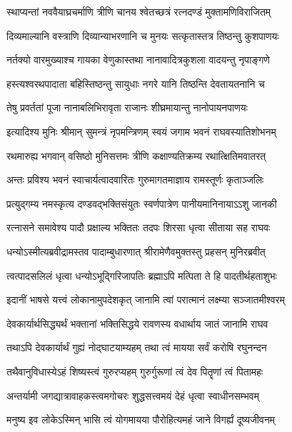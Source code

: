 \twolineshloka
{स्थाप्यन्तां नववैयाघ्रचर्माणि त्रीणि चानय}
{श्वेतच्छत्रं रत्नदण्डं मुक्तामणिविराजितम्} %

\twolineshloka
{दिव्यमाल्यानि वस्त्राणि दिव्यान्याभरणानि च}
{मुनयः सत्कृतास्तत्र तिष्ठन्तु कुशपाणयः} %

\twolineshloka
{नर्तक्यो वारमुख्याश्च गायका वेणुकास्तथा}
{नानावादित्रकुशला वादयन्तु नृपाङ्गणे} %

\twolineshloka
{हस्त्यश्वरथपादाता बहिस्तिष्ठन्तु सायुधाः}
{नगरे यानि तिष्ठन्ति देवतायतनानि च} %

\twolineshloka
{तेषु प्रवर्ततां पूजा नानाबलिभिरावृता}
{राजानः शीघ्रमायान्तु नानोपायनपाणयः} %

\twolineshloka
{इत्यादिश्य मुनिः श्रीमान् सुमन्त्रं नृपमन्त्रिणम्}
{स्वयं जगाम भवनं राघवस्यातिशोभनम्} %

\twolineshloka
{रथमारुह्य भगवान् वसिष्ठो मुनिसत्तमः}
{त्रीणि कक्षाण्यतिक्रम्य रथात्क्षितिमवातरत्} %

\twolineshloka
{अन्तः प्रविश्य भवनं स्वाचार्यत्वादवारितः}
{गुरुमागतमाज्ञाय रामस्तूर्णः कृताञ्जलिः} %

\twolineshloka
{प्रत्युद्गम्य नमस्कृत्य दण्डवद्भक्तिसंयुतः}
{स्वर्णपात्रेण पानीयमानिनायाऽऽशु जानकी} %

\twolineshloka
{रत्नासने समावेश्य पादौ प्रक्षाल्य भक्तितः}
{तदपः शिरसा धृत्वा सीताया सह राघवः} %

\twolineshloka
{धन्योऽस्मीत्यब्रवीद्रामस्तव पादाम्बुधारणात्}
{श्रीरामेणैवमुक्तस्तु प्रहसन् मुनिरब्रवीत्} %

\twolineshloka
{त्वत्पादसलिलं धृत्वा धन्योऽभूद्गिरिजापतिः}
{ब्रह्माऽपि मत्पिता ते हि पादतीर्थहताशुभः} %

\twolineshloka
{इदानीं भाषसे यत्त्वं लोकानामुपदेशकृत्}
{जानामि त्वां परात्मानं लक्ष्म्या सञ्जातमीश्वरम्} %

\twolineshloka
{देवकार्यार्थसिद्ध्यर्थं भक्तानां भक्तिसिद्धये}
{रावणस्य वधार्थाय जातं जानामि राघव} %

\twolineshloka
{तथाऽपि देवकार्यार्थं गुह्यं नोद्घाटयाम्यहम्}
{तथा त्वं मायया सर्वं करोषि रघुनन्दन} %

\twolineshloka
{तथैवानुविधास्येऽहं शिष्यस्त्वं गुरुरप्यहम्}
{गुरुर्गुरूणां त्वं देव पितॄणां त्वं पितामहः} %

\twolineshloka
{अन्तर्यामी जगद्यात्रावाहकस्त्वमगोचरः}
{शुद्धसत्त्वमयं देहं धृत्वा स्वाधीनसम्भवम्} %

\twolineshloka
{मनुष्य इव लोकेऽस्मिन् भासि त्वं योगमायया}
{पौरोहित्यमहं जाने विगर्ह्यं दूष्यजीवनम्} %

